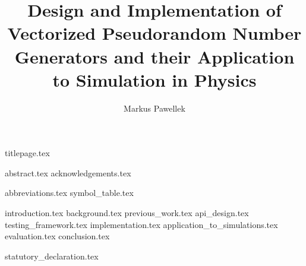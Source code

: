 \documentclass[fleqn,10pt,twoside]{stdglobal}
\title{Design and Implementation of Vectorized Pseudorandom Number Generators and their Application to Simulation in Physics}
\author{Markus Pawellek}
\let\oldpagenumbering\pagenumbering
\renewcommand*\pagenumbering[1]{\cleardoublepage\oldpagenumbering{#1}}
\begin{document}

  {titlepage.tex}

  {abstract.tex}
  {acknowledgements.tex}

  \tableofcontents
  \listoffigures
  {abbreviations.tex}
  {symbol_table.tex}

  {introduction.tex}
  {background.tex}
  {previous_work.tex}
  {api_design.tex}
  {testing_framework.tex}
  {implementation.tex}
  {application_to_simulations.tex}
  {evaluation.tex}
  {conclusion.tex}
  \printbibheading[heading=bibintoc]
  \printbibliography[notkeyword={c++},heading=subbibliography,title={General}]
  \printbibliography[keyword={c++},heading=subbibliography,title={Programming}]


  {statutory_declaration.tex}
\end{document}
